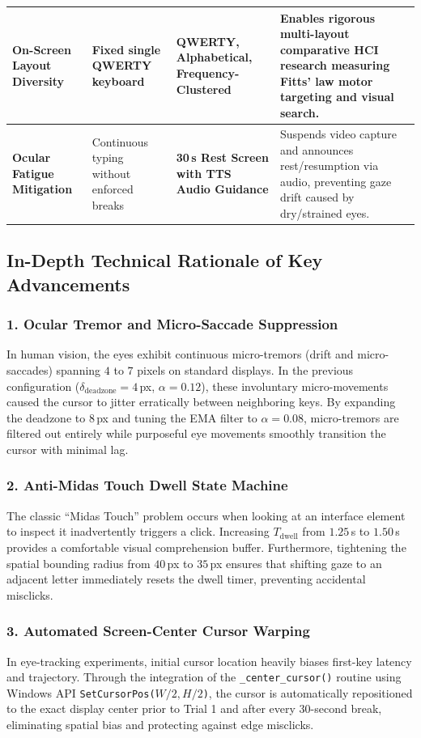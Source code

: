 \documentclass[11pt,a4paper]{article}
\begin{document}
\begin{table}[H]
\begin{tabularx}{\textwidth}{p{} p{} p{} X}
\midrule
\textbf{On-Screen Layout Diversity} & Fixed single QWERTY keyboard & \textbf{QWERTY, Alphabetical, Frequency-Clustered} & Enables rigorous multi-layout comparative HCI research measuring Fitts' law motor targeting and visual search. \\
\midrule
\textbf{Ocular Fatigue Mitigation} & Continuous typing without enforced breaks & \textbf{30\,s Rest Screen with TTS Audio Guidance} & Suspends video capture and announces rest/resumption via audio, preventing gaze drift caused by dry/strained eyes. \\
\bottomrule
\end{tabularx}
\end{table}

\subsection{In-Depth Technical Rationale of Key Advancements}

\subsubsection{1. Ocular Tremor and Micro-Saccade Suppression}
In human vision, the eyes exhibit continuous micro-tremors (drift and micro-saccades) spanning $4$ to $7$ pixels on standard displays. In the previous configuration ($\delta_{\text{deadzone}} = 4$\,px, $\alpha=0.12$), these involuntary micro-movements caused the cursor to jitter erratically between neighboring keys. By expanding the deadzone to $8$\,px and tuning the EMA filter to $\alpha=0.08$, micro-tremors are filtered out entirely while purposeful eye movements smoothly transition the cursor with minimal lag.

\subsubsection{2. Anti-Midas Touch Dwell State Machine}
The classic ``Midas Touch'' problem occurs when looking at an interface element to inspect it inadvertently triggers a click. Increasing $T_{\text{dwell}}$ from $1.25$\,s to $1.50$\,s provides a comfortable visual comprehension buffer. Furthermore, tightening the spatial bounding radius from $40$\,px to $35$\,px ensures that shifting gaze to an adjacent letter immediately resets the dwell timer, preventing accidental misclicks.

\subsubsection{3. Automated Screen-Center Cursor Warping}
In eye-tracking experiments, initial cursor location heavily biases first-key latency and trajectory. Through the integration of the \texttt{\_center\_cursor()} routine using Windows API \texttt{SetCursorPos($W/2, H/2$)}, the cursor is automatically repositioned to the exact display center prior to Trial 1 and after every 30-second break, eliminating spatial bias and protecting against edge misclicks.
\end{document}
